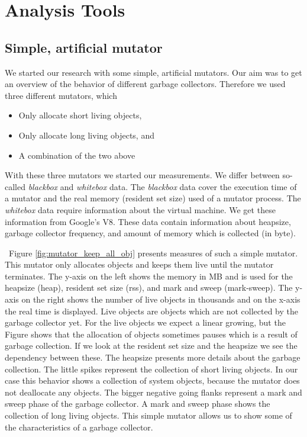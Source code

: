 
\section{Analysis Tools} \label{sec:analysis_tools}

\subsection{Simple, artificial mutator}

We started our research with some simple, artificial mutators. Our aim was to get an overview of the behavior of different \JS garbage collectors. Therefore we used three different mutators, which
\begin{itemize}
	\item Only allocate short living objects,
	\item Only allocate long living objects, and 
	\item A combination of the two above
\end{itemize}
With these three mutators we started our measurements. We differ between so-called \textit{blackbox} and \textit{whitebox} data. The \textit{blackbox} data cover the execution time of a mutator and the real memory (resident set size) used of a mutator process. The \textit{whitebox} data require information about the \JS virtual machine. We get these information from Google's V8. These data contain information about heapsize, garbage collector frequency, and amount of memory which is collected (in byte).

\
Figure \ref{fig:mutator_keep_all_obj} presents measures of such a simple mutator. This mutator only allocates objects and keeps them live until the mutator terminates. The y-axis on the left shows the memory in MB and is used for the heapsize (heap), resident set size (rss), and mark and sweep (mark-sweep). The y-axis on the right shows the number of live objects in thousands and on the x-axis the real time is displayed. Live objects are objects which are not collected by the garbage collector yet. For the live objects we expect a linear growing, but the Figure shows that the allocation of objects sometimes pauses which is a result of garbage collection. If we look at the resident set size and the heapsize we see the dependency between these. The heapsize presents more details about the garbage collection. The little spikes represent the collection of short living objects. In our case this behavior shows a collection of system objects, because the mutator does not deallocate any objects. The bigger negative going flanks represent a mark and sweep phase of the garbage collector. A mark and sweep phase shows the collection of long living objects. This simple mutator allows us to show some of the characteristics of a garbage collector.


